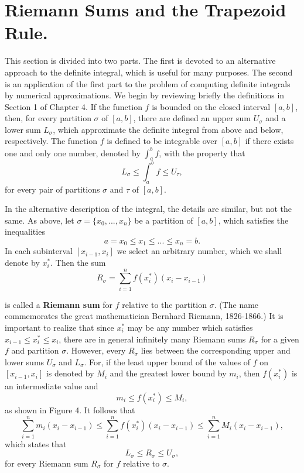 \section{Riemann Sums and the Trapezoid Rule.}\label{sec 8.2} 
This section is divided into two parts. The first is devoted to an alternative approach to the definite integral, which is useful for many purposes. The second is an application of the first part to the problem of computing definite integrals by numerical approximations. We begin by reviewing briefly the definitions in Section 1 of Chapter 4. If the function $f$ is bounded on the closed interval $[a, b]$, then, for every partition $\sigma$ of $[a, b]$, there are defined an upper sum $U_\sigma$ and a lower sum $L_\sigma$, which approximate the definite integral from above and below, respectively. The function $f$ is defined to be integrable over $[a, b]$ if there exists one and only one number, denoted by $\int_a^b f$, with the property that 
$$
L_\sigma \leq \int_a^b f \leq U_\tau, 
$$
\noindent for every pair of partitions $\sigma$ and $\tau$ of $[a, b]$.

In the alternative description of the integral, the details are similar, but not the same. As above, let $\sigma = \{ x_0, . . ., x_n \}$ be a partition of $[a, b]$, which satisfies the inequalities 
$$
a = x_0 \leq x_1 \leq ... \leq x_n = b.
$$
\noindent In each subinterval $[x_{i-1}, x_i]$ we select an arbitrary number, which we shall denote by $x_i^{*}$. Then the sum
$$
R_\sigma = \sum_{i = 1}^{n} f(x_i^{*})(x_i - x_{i-1})  
$$

\noindent is called a \textbf{Riemann sum} for $f$ relative to the partition $\sigma$. (The name commemorates the great mathematician Bernhard Riemann, 1826-1866.) It is important to realize that since $x_i^{*}$ may be any number which satisfies $x_{i-1} \leq x_i^{*} \leq x_i$, there are in general infinitely many Riemann sums $R_\sigma$ for a given $f$ and partition $\sigma$. However, every $R_\sigma$ lies between the corresponding upper and lower sums $U_\sigma$ and $L_\sigma$. For, if the least upper bound of the values of $f$ on $[x_{i-1}, x_i]$ is denoted by $M_i$ and the greatest lower bound by $m_i$, then $f(x_i^{*})$ is an intermediate value and
$$
m_i \leq f(x_i^{*}) \leq M_i, 
$$
\noindent as shown in Figure 4. It follows that
$$
\sum_{i=1}^n m_{i}(x_i - x_{i - 1}) \leq \sum_{i=1}^n f(x_i^{*})(x_i - x_{i - 1}) \leq \sum_{i=1}^n M_i(x_i - x_{i-1}),
$$
\noindent which states that
$$
L_\sigma \leq R_\sigma \leq U_\sigma, 
$$
\noindent for every Riemann sum $R_\sigma$ for $f$ relative to $\sigma$.  

